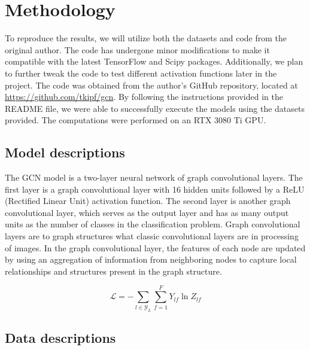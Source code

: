 \documentclass[11pt,a4paper]{article}
\begin{document}



\section{Methodology}


To reproduce the results, we will utilize both the datasets and code from the original author. The code has undergone minor modifications to make it compatible with the latest TensorFlow and Scipy packages. Additionally, we plan to further tweak the code to test different activation functions later in the project. The code was obtained from the author's GitHub repository, located at \url{https://github.com/tkipf/gcn}. By following the instructions provided in the README file, we were able to successfully execute the models using the datasets provided. The computations were performed on an RTX 3080 Ti GPU.

\subsection{Model descriptions}

The GCN model is a two-layer neural network of graph convolutional layers. The first layer is a graph convolutional layer with 16 hidden units followed by a ReLU (Rectified Linear Unit) activation function. The second layer is another graph convolutional layer, which serves as the output layer and has as many output units as the number of classes in the classification problem. Graph convolutional layers are to graph structures what classic convolutional layers are in processing of images. In the graph convolutional layer, the features of each node are updated by using an aggregation of information from neighboring nodes to capture local relationships and structures present in the graph structure.

\begin{equation}
  \mathcal{L} = -\sum_{l\in \mathcal{Y}_L}\sum_{f=1}^{F} Y_{lf}\ln Z_{lf}
\end{equation}

\subsection{Data descriptions}
\end{document}
